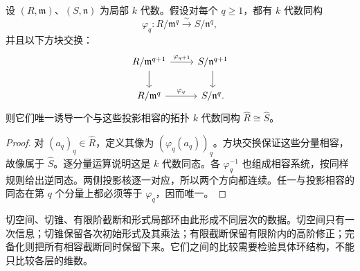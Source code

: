 \begin{proposition}
\label{g5:prop:compatible-truncation-isomorphisms}
	设 \((R,\mathfrak m)\)、\((S,\mathfrak n)\) 为局部 \(k\) 代数。假设对每个 \(q\geq1\)，都有 \(k\) 代数同构
	\[
		\varphi_q:R/\mathfrak m^q\xrightarrow{\ \sim\ }S/\mathfrak n^q,
	\]
	并且以下方块交换：
	\[
		\begin{tikzcd}
			R/\mathfrak m^{q+1} \arrow[r,"\varphi_{q+1}"] \arrow[d]
			& S/\mathfrak n^{q+1} \arrow[d] \\
			R/\mathfrak m^q \arrow[r,"\varphi_q"]
			& S/\mathfrak n^q.
		\end{tikzcd}
	\]
	则它们唯一诱导一个与这些投影相容的拓扑 \(k\) 代数同构
	\(\widehat R\cong\widehat S\)。
\end{proposition}
\begin{proof}
	对 \((a_q)_q\in\widehat R\)，定义其像为 \((\varphi_q(a_q))_q\)。方块交换保证这些分量相容，故像属于 \(\widehat S\)。逐分量运算说明这是 \(k\) 代数同态。各 \(\varphi_q^{-1}\) 也组成相容系统，按同样规则给出逆同态。两侧投影核逐一对应，所以两个方向都连续。任一与投影相容的同态在第 \(q\) 个分量上都必须等于 \(\varphi_q\)，因而唯一。
\end{proof}

切空间、切锥、有限阶截断和形式局部环由此形成不同层次的数据。切空间只有一次信息；切锥保留各次初始形式及其乘法；有限截断保留有限阶内的高阶修正；完备化则把所有相容截断同时保留下来。它们之间的比较需要检验具体环结构，不能只比较各层的维数。

